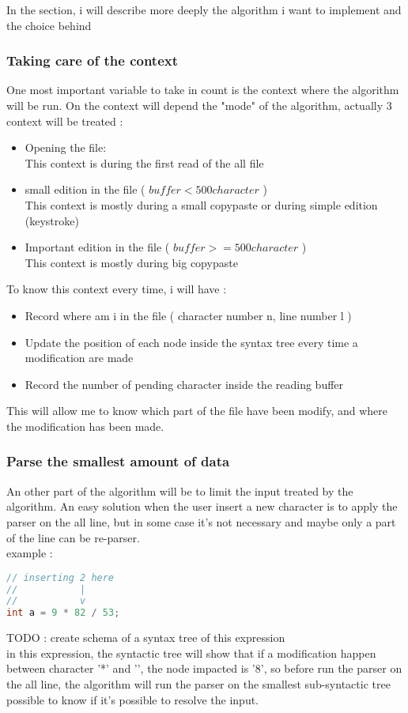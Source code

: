 In the section, i will describe more deeply the algorithm i want to implement and the choice behind
\subsubsection{Taking care of the context}
One most important variable to take in count is the context where the algorithm will be run. On the context will depend the "mode" of the algorithm, actually 3 context will be treated :
\begin{itemize}
\item Opening the file: \\
This context is during the first read of the all file
\item small edition in the file ( \( buffer < 500 character\) )\\
This context is mostly during a small copy\/paste or during simple edition (keystroke)
\item Important edition in the file ( \( buffer >= 500 character\) )\\
This context is mostly during big copy\/paste
\end{itemize}

To know this context every time, i will have :

\begin{itemize}
\item Record where am i in the file ( character number n, line number l )
\item Update the position of each node inside the syntax tree every time a modification are made
\item Record the number of pending character inside the reading buffer
\end{itemize}
This will allow me to know which part of the file have been modify, and where the modification has been made.\\

\subsubsection{Parse the smallest amount of data}
An other part of the algorithm will be to limit the input treated by the algorithm. An easy solution when the user insert a new character is to apply the parser on the all line, but in some case it's not necessary and maybe only a part of the line can be re-parser.\\
example :
\begin{lstlisting}[language=C++, caption=parsing optimisation in C]
// inserting 2 here
//           |
//           v
int a = 9 * 82 / 53;
\end{lstlisting}
TODO : create schema of a syntax tree of this expression \\
in this expression, the syntactic tree will show that if a modification happen between character '*' and '\/', the node impacted is '8', so before run the parser on the all line, the algorithm will run the parser on the smallest sub-syntactic tree possible to know if it's possible to resolve the input.


